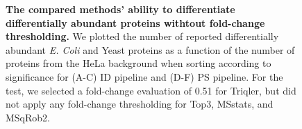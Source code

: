 \documentclass[11pt]{article}
\begin{document}
\begin{figure}[hbt]
\begin{tabular}{lclc}
    \end{tabular}
    \caption{{\bf The compared methods' ability to differentiate differentially abundant proteins withtout fold-change thresholding.} We plotted the number of reported differentially abundant  {\em E. Coli} and Yeast proteins as a function of the number of proteins from the HeLa background when sorting according to significance for (A-C) ID pipeline and (D-F) PS pipeline. For the test, we selected a fold-change evaluation of 0.51 for Triqler, but did not apply any fold-change thresholding for Top3, MSstats, and MSqRob2. \label{fig:ability_to_differentiate_differentially_abundant_specie_vs_hela}}
\end{figure}
\end{document}
